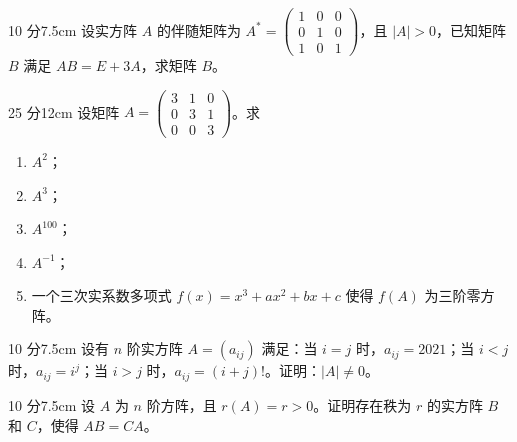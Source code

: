 \begin{problem}{10 分}{7.5cm}
设实方阵 $A$ 的伴随矩阵为 $A^{*}=\begin{pmatrix}1&0&0\\0&1&0\\1&0&1\end{pmatrix}$，且 $|A|>0$，已知矩阵 $B$ 满足 $AB=E+3A$，求矩阵 $B$。
\end{problem}

\begin{problem}{25 分}{12cm}
设矩阵 $A=\begin{pmatrix}3&1&0\\0&3&1\\0&0&3\end{pmatrix}$。求
\begin{enumerate}[label=(\arabic*),leftmargin=2.2em,itemsep=0.25em,topsep=0.3em]
  \item $A^{2}$；
  \item $A^{3}$；
  \item $A^{100}$；
  \item $A^{-1}$；
  \item 一个三次实系数多项式 $f(x)=x^{3}+ax^{2}+bx+c$ 使得 $f(A)$ 为三阶零方阵。
\end{enumerate}
\end{problem}

\begin{problem}{10 分}{7.5cm}
设有 $n$ 阶实方阵 $A=(a_{ij})$ 满足：当 $i=j$ 时，$a_{ij}=2021$；当 $i<j$ 时，$a_{ij}=i^{j}$；当 $i>j$ 时，$a_{ij}=(i+j)!$。证明：$|A|\ne 0$。
\end{problem}

\begin{problem}{10 分}{7.5cm}
设 $A$ 为 $n$ 阶方阵，且 $r(A)=r>0$。证明存在秩为 $r$ 的实方阵 $B$ 和 $C$，使得 $AB=CA$。
\end{problem}
